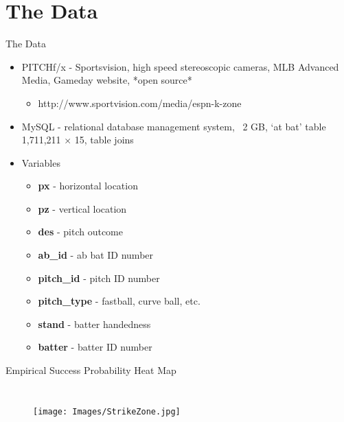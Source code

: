 \documentclass{beamer}
\begin{document}

\section{The Data} %

\begin{frame}{The Data} %
\begin{itemize}
  \addtolength{\itemsep}{0.5\baselineskip}
\item PITCHf/x\textsuperscript{\textregistered} - Sportsvision, high speed stereoscopic cameras, MLB Advanced Media, Gameday website, *open source*
    \begin{itemize}
    \addtolength{\itemsep}{0.5\baselineskip}
    \item http://www.sportvision.com/media/espn-k-zone
    \end{itemize}
\item MySQL - relational database management system, ~2 GB, `at bat' table 1,711,211 $\times$ 15, table joins
\item Variables   
  \begin{itemize}
   \item \textbf{px} - horizontal location
   \item \textbf{pz} - vertical location
   \item \textbf{des} - pitch outcome
   \item \textbf{ab\_id} - ab bat ID number
   \item \textbf{pitch\_id} - pitch ID number
   \item \textbf{pitch\_type} - fastball, curve ball, etc.
   \item \textbf{stand} - batter handedness
   \item \textbf{batter} - batter ID number
   \end{itemize}
\end{itemize}
\end{frame}


\begin{frame}{Empirical Success Probability Heat Map} %
\begin{columns}


  \begin{figure}[H]
	\centering
	\texttt{[image: Images/StrikeZone.jpg]}
	\end{figure}

	
\end{columns}
\end{frame}
\end{document}

